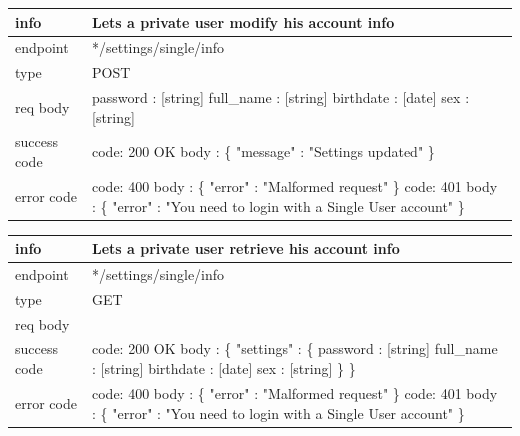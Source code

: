 \documentclass[titlepage]{article}
\begin{document}
	\vspace{\baselineskip}
	
	\begin{tabularx}{\textwidth}{lX} \hline
		info & Lets a private user modify his account info \\ \hline
		endpoint & */settings/single/info \\ \hline
		type & POST \\ \hline
		req body & 
		password : [string] \newline
		full\_name : [string] \newline
		birthdate : [date] \newline
		sex : [string] \\ \hline
		success code &
		code: 200 OK \newline \newline 
		body : \{ \newline
		"message" : "Settings updated" \newline
		\} \\ \hline
		error code &
		code: 400 \newline
		body : \{ "error" : "Malformed request" \} \newline \newline
		code: 401 \newline
		body : \{ "error" : "You need to login with a Single User account" \} \\ \hline
	\end{tabularx}
	
	\vspace{\baselineskip}
	
	\begin{tabularx}{\textwidth}{lX} \hline
		info & Lets a private user retrieve his account info \\ \hline
		endpoint & */settings/single/info \\ \hline
		type & GET \\ \hline
		req body & \\ \hline
		success code &
		code: 200 OK \newline \newline 
		body : \{ \newline
		"settings" : \{ \newline
		password : [string] \newline
		full\_name : [string] \newline
		birthdate : [date] \newline
		sex : [string] \newline
		\} \newline
		\} \\ \hline
		error code &
		code: 400 \newline
		body : \{ "error" : "Malformed request" \} \newline \newline
		code: 401 \newline
		body : \{ "error" : "You need to login with a Single User account" \} \\ \hline
	\end{tabularx}
	
\end{document}
